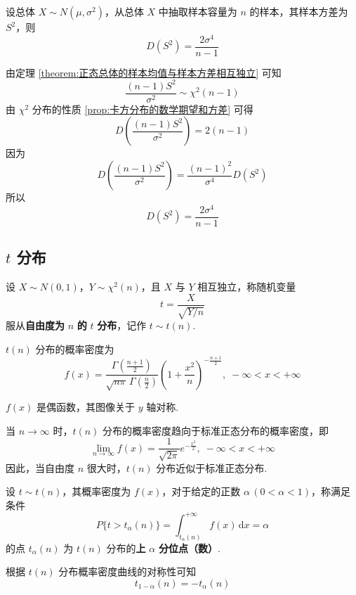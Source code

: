 \begin{theorem}
    设总体 $X \sim N(\mu,\sigma^2)$，从总体 $X$ 中抽取样本容量为 $n$ 的样本，其样本方差为 $S^2$，则
    $$
    D(S^2) = \dfrac{2 \sigma^4}{n-1}
    $$
\end{theorem}

\begin{myproof}
    由定理 \ref{theorem:正态总体的样本均值与样本方差相互独立} 可知
    $$
    \dfrac{(n-1) S^2}{\sigma^2} \sim \chi^2(n-1)
    $$
    由 $\chi^2$ 分布的性质 \ref*{prop:卡方分布的数学期望和方差} 可得
    $$
    D \left( \dfrac{(n-1) S^2}{\sigma^2} \right) = 2(n-1)
    $$
    因为
    $$
    D \left( \dfrac{(n-1) S^2}{\sigma^2} \right) = \dfrac{(n-1)^2}{\sigma^4} D(S^2)
    $$
    所以
    $$
    D(S^2) = \dfrac{2 \sigma^4}{n-1}
    $$
\end{myproof}

\subsection{\texorpdfstring{$t$}{} 分布}

\begin{definition} \label{def:t分布}
    设 $X \sim N(0,1)$，$Y \sim \chi^2(n)$，且 $X$ 与 $Y$ 相互独立，称随机变量
    $$
    t = \dfrac{X}{\sqrt{Y/n}}
    $$
    服从\textbf{自由度为} $n$ \textbf{的} $t$ \textbf{分布}，记作 $t \sim t(n)$.
\end{definition}

$t(n)$ 分布的概率密度为
$$
f(x) = \dfrac{\Gamma(\frac{n+1}{2})}{\sqrt{n \pi} \, \Gamma(\frac{n}{2})} \left( 1 + \dfrac{x^2}{n} \right)^{-\frac{n+1}{2}}, \; -\infty < x < +\infty
$$

$f(x)$ 是偶函数，其图像关于 $y$ 轴对称.

当 $n \to \infty$ 时，$t(n)$ 分布的概率密度趋向于标准正态分布的概率密度，即
$$
\lim_{n \to \infty} f(x) = \dfrac{1}{\sqrt{2 \pi}} e^{-\frac{x^2}{2}}, \; -\infty < x < +\infty
$$
因此，当自由度 $n$ 很大时，$t(n)$ 分布近似于标准正态分布.

\begin{definition}
    设 $t \sim t(n)$，其概率密度为 $f(x)$，对于给定的正数 $\alpha \, (0 < \alpha < 1)$，称满足条件
    $$
    P \{ t > t_{\alpha}(n) \} = \int_{t_{\alpha}(n)}^{+\infty} f(x) \, \text{d}x = \alpha
    $$
    的点 $t_{\alpha}(n)$ 为 $t(n)$ 分布的\textbf{上} $\alpha$ \textbf{分位点（数）}.
\end{definition}

根据 $t(n)$ 分布概率密度曲线的对称性可知
$$
t_{1 - \alpha}(n) = -t_{\alpha}(n)
$$

